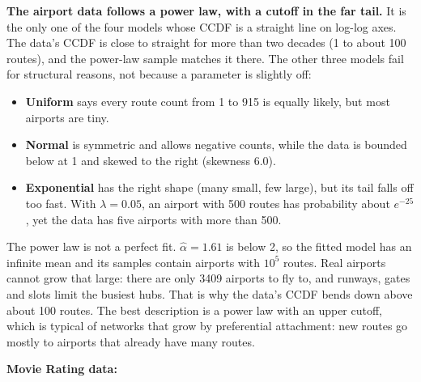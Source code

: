 \documentclass[11pt]{article}
\begin{document}
\begin{itemize}
{    \textbf{The airport data follows a power law, with a cutoff in the far tail.}
    It is the only one of the four models whose CCDF is a straight line on log-log
    axes. The data's CCDF is close to straight for more than two decades (1 to about
    100 routes), and the power-law sample matches it there. The other three models fail
    for structural reasons, not because a parameter is slightly off:
    \begin{itemize}
      \item \textbf{Uniform} says every route count from 1 to 915 is equally likely,
            but most airports are tiny.
      \item \textbf{Normal} is symmetric and allows negative counts, while the data is
            bounded below at 1 and skewed to the right (skewness 6.0).
      \item \textbf{Exponential} has the right shape (many small, few large), but its
            tail falls off too fast. With $\lambda = 0.05$, an airport with 500 routes
            has probability about $e^{-25}$, yet the data has five airports with more
            than 500.
    \end{itemize}
    The power law is not a perfect fit. $\hat\alpha = 1.61$ is below 2, so the fitted
    model has an infinite mean and its samples contain airports with $10^5$ routes. Real
    airports cannot grow that large: there are only 3409 airports to fly to, and
    runways, gates and slots limit the busiest hubs. That is why the data's CCDF bends
    down above about 100 routes. The best description is a power law with an upper
    cutoff, which is typical of networks that grow by preferential attachment: new
    routes go mostly to airports that already have many routes.}
\end{itemize}

\clearpage
\textbf{Movie Rating data:}
\end{document}
